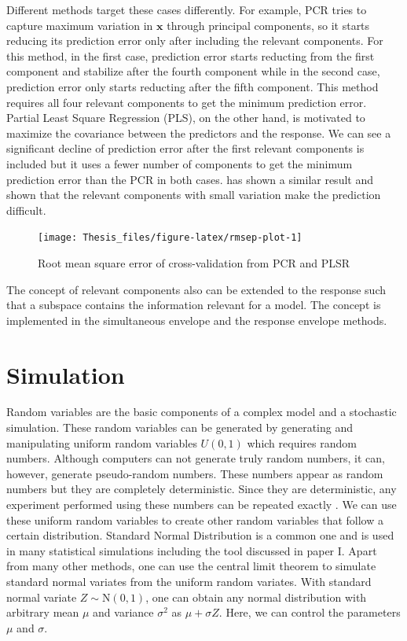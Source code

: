 \documentclass[11pt,twoside,openright,titlepage,
  headinclude,footinclude,BCOR=5mm,
  numbers=noenddot,cleardoublepage=empty,
  tablecaptionabove, dottedtoc,
  bibliography=totoc,paper=a4]{scrreprt}
\begin{document}
Different methods target these cases differently. For example, PCR tries to capture maximum variation in \(\mathbf{x}\) through principal components, so it starts reducing its prediction error only after including the relevant components. For this method, in the first case, prediction error starts reducting from the first component and stabilize after the fourth component while in the second case, prediction error only starts reducting after the fifth component. This method requires all four relevant components to get the minimum prediction error. Partial Least Square Regression (PLS), on the other hand, is motivated to maximize the covariance between the predictors and the response. We can see a significant decline of prediction error after the first relevant components is included but it uses a fewer number of components to get the minimum prediction error than the PCR in both cases. \citet{Helland1994b} has shown a similar result and shown that the relevant components with small variation make the prediction difficult.

\begin{figure}[!htb]
\texttt{[image: Thesis\_files/figure-latex/rmsep-plot-1]} \caption[]{Root mean square error of cross-validation from PCR and PLSR}\label{fig:rmsep-plot}
\end{figure}

The concept of relevant components also can be extended to the response such that a subspace contains the information relevant for a model. The concept is implemented in the simultaneous envelope \citep{cook2015simultaneous} and the response envelope \citep{cook2010envelope} methods.

\hypertarget{simulation}{%
\section{Simulation}\label{simulation}}

Random variables are the basic components of a complex model and a stochastic simulation. These random variables can be generated by generating and manipulating uniform random variables \(U(0, 1)\) which requires random numbers. Although computers can not generate truly random numbers, it can, however, generate pseudo-random numbers. These numbers appear as random numbers but they are completely deterministic. Since they are deterministic, any experiment performed using these numbers can be repeated exactly \citep{jones2014introduction}. We can use these uniform random variables to create other random variables that follow a certain distribution. Standard Normal Distribution is a common one and is used in many statistical simulations including the tool discussed in paper I. Apart from many other methods, one can use the central limit theorem to simulate standard normal variates from the uniform random variates. With standard normal variate \(Z \sim \mathrm{N}(0, 1)\), one can obtain any normal distribution with arbitrary mean \(\mu\) and variance \(\sigma^2\) as \(\mu + \sigma Z\). Here, we can control the parameters \(\mu\) and \(\sigma\).
\end{document}
